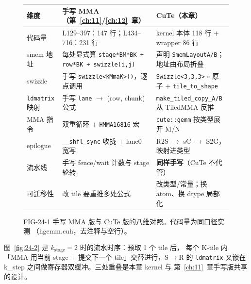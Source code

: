 \begin{figure}[htbp]
\centering
\small
\begin{tabular}{p{2.5cm}p{5.3cm}p{5.7cm}}
\toprule
维度 & 手写 MMA（第~\ref{ch:11}/\ref{ch:12}~章） & CuTe（本章） \\
\midrule
代码量 & L129--397：147 行；L434--716：231 行 &
kernel 本体 118 行 $+$ wrapper 86 行 \\
\addlinespace
smem 地址 & 每处显式算 \texttt{stage*BM*BK + row*BK + swizzle\allowbreak{}(i,\allowbreak{}j)} &
声明 \texttt{Smem\allowbreak{}Layout\allowbreak{}A/\allowbreak{}B}；地址由布局折叠 \\
\addlinespace
swizzle & 手写 \texttt{swizzle\allowbreak{}<k\allowbreak{}Mma\allowbreak{}K>\allowbreak{}()}，逐点调用 &
\texttt{Swizzle\allowbreak{}<3,\allowbreak{}3,\allowbreak{}3>} $\circ$ 原子 $+$ \texttt{tile\_\allowbreak{}to\_\allowbreak{}shape} \\
\addlinespace
\texttt{ldmatrix} 映射 & 手写 \texttt{lane} $\to$ (row, chunk) 公式 &
\texttt{make\_\allowbreak{}tiled\_\allowbreak{}copy\_\allowbreak{}A/\allowbreak{}B} 从 TiledMMA 反推 \\
\addlinespace
MMA 指令 & 双重循环 $+$ \texttt{HMMA16816} 宏 &
\texttt{cute::gemm} 按类型展开 M/N \\
\addlinespace
epilogue & \texttt{\_\_shfl\_sync} 收拢 $+$ lane0 宽写 &
R2S $\to$ sC $\to$ S2G，映射进类型 \\
\addlinespace
流水线 & 手写 fence/wait 计数与 stage 轮转 &
\textbf{同样手写}（CuTe 不代管） \\
\addlinespace
可迁移性 & 改 tile 要重推多处公式 &
改类型/常量；换 atom、换 dtype 局部化 \\
\bottomrule
\end{tabular}
\caption{FIG-24-1 手写 MMA 版与 CuTe 版的八维对照。代码量为同口径实测
（hgemm.cuh，去注释与空行）。}
\label{fig:24-1}
\end{figure}

图~\ref{fig:24-2} 是 $k_{\mathrm{stage}}=2$ 时的流水时序：预取 1 个 tile 后，
每个 K-tile 内「MMA 用当前 stage $+$ 提交下一个 tile」交替进行，S$\to$R 的
\texttt{ldmatrix} 又嵌在 k\_step 之间做寄存器双缓冲。三处重叠是本章 kernel 与
第~\ref{ch:11}~章手写版共享的设计。

